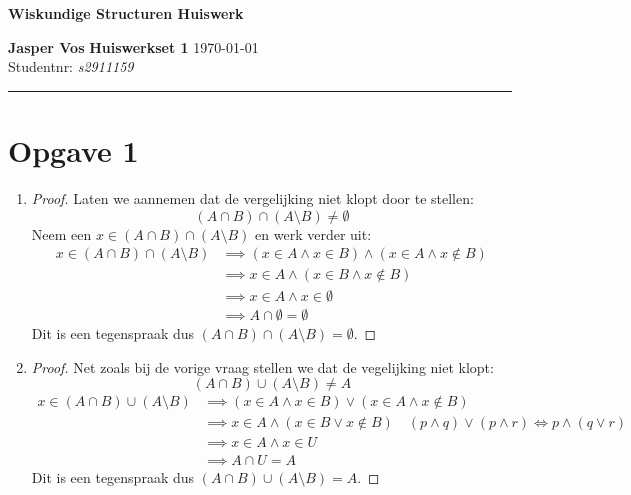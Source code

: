 \documentclass{article}
\begin{document}
{\Large \textbf{Wiskundige Structuren Huiswerk}}

\bigskip

\textbf{Jasper Vos} \hfill \textbf{Huiswerkset 1} \hfill \today \\
Studentnr: \emph{s2911159} 

\rule{\textwidth}{2pt}

\bigskip

\section*{Opgave 1}
    \begin{enumerate}[label=\alph*)]
        \item 
            \begin{proof}
                Laten we aannemen dat de vergelijking niet klopt door te stellen:
                \[(A \cap B) \cap (A \setminus B) \neq \emptyset\]
                Neem een $x \in (A \cap B) \cap (A \setminus B)$ en werk verder uit:
                \begin{align*}
                    x \in (A \cap B) \cap (A \setminus B) &\implies (x \in A \wedge x \in B) \wedge (x \in A \wedge x \notin B) \\
                    &\implies x \in A \wedge (x \in B \wedge x \notin B) \\
                    &\implies x \in A \wedge x \in \emptyset \\
                    &\implies A \cap \emptyset = \emptyset
                \end{align*}
                Dit is een tegenspraak dus $(A \cap B) \cap (A \setminus B) = \emptyset$.
            \end{proof}
        \item
            \begin{proof}
                Net zoals bij de vorige vraag stellen we dat de vegelijking niet klopt:
                \[(A \cap B) \cup (A \setminus B) \neq A\]
                \begin{align*}
                    x \in (A \cap B) \cup (A \setminus B) &\implies (x \in A \wedge x \in B) \vee (x \in A \wedge x \notin B) \\
                    &\implies x \in A \wedge (x \in B \vee x \notin B) \quad (p \wedge q) \vee (p \wedge r) \Leftrightarrow p \wedge (q \vee r) \\
                    &\implies x \in A \wedge x \in U \\
                    &\implies A \cap U = A
                \end{align*}
                Dit is een tegenspraak dus $(A \cap B) \cup (A \setminus B) = A$.
            \end{proof}
    \end{enumerate}
\end{document}
